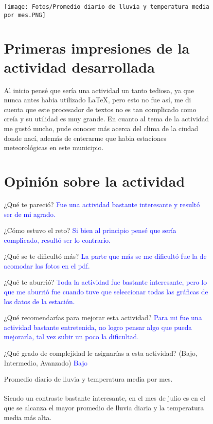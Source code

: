 \documentclass{article}
\begin{document}
\begin{figure}[H]
    \centering
    \texttt{[image: Fotos/Promedio diario de lluvia y temperatura media por mes.PNG]}
    \caption{Promedio diario de lluvia y temperatura media por mes.\\
    \\
    Siendo un contraste bastante interesante, en el mes de julio es en el que se alcanza el mayor promedio de lluvia diaria y la temperatura media más alta.}
    
    \section{Primeras impresiones de la actividad desarrollada}
    
    Al inicio pensé que sería una actividad un tanto tediosa, ya que nunca antes habia utilizado LaTeX, pero esto no fue así, me di cuenta que este procesador de textos no es tan complicado como creía y su utilidad es muy grande. En cuanto al tema de la actividad me gustó mucho, pude conocer más acerca del clima de la ciudad donde nací, además de enterarme que habia estaciones meteorológicas en este municipio.
    
    \section{Opinión sobre la actividad}
    
    ¿Qué te pareció?
    \textcolor{blue}{Fue una actividad bastante interesante y resultó ser de mi agrado.}
    
    ¿Cómo estuvo el reto?
    \textcolor{blue}{Si bien al principio pensé que sería complicado, resultó ser lo contrario.}
    
    ¿Qué se te dificultó más?
    \textcolor{blue}{La parte que más se me dificultó fue la de acomodar las fotos en el pdf.}
    
    ¿Qué te aburrió?
    \textcolor{blue}{Toda la actividad fue bastante interesante, pero lo que me aburrió fue cuando tuve que seleccionar todas las gráficas de los datos de la estación.}
    
    ¿Qué recomendarías para mejorar esta actividad?
    \textcolor{blue}{Para mi fue una actividad bastante entretenida, no logro pensar algo que pueda mejorarla, tal vez subir un poco la dificultad.}
    
    ¿Qué grado de complejidad le asignarías a esta actividad? (Bajo, Intermedio, Avanzado)
    \textcolor{blue}{Bajo}
    
\end{figure}
\end{document}

